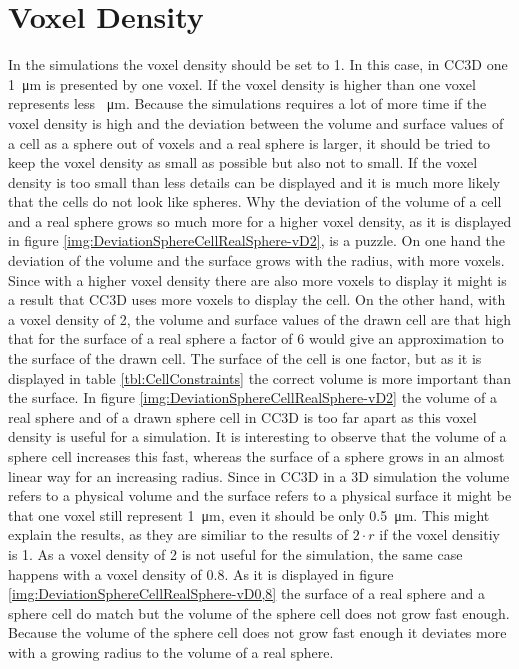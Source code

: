 \section{Voxel Density}\label{sec:vD}
In the simulations the voxel density should be set to 1. In this case, in \ac{CC3D} one \SI{1}{\micro\metre} is presented by one voxel. If the voxel density is higher than one voxel represents less \SI{}{\micro\metre}. Because the simulations requires a lot of more time if the voxel density is high and the deviation between the volume and surface values of a cell as a sphere out of voxels and a real sphere is larger, it should be tried to keep the voxel density as small as possible but also not to small. If the voxel density is too small than less details can be displayed and it is much more likely that the cells do not look like spheres. Why the deviation of the volume of a cell and a real sphere grows so much more for a higher voxel density, as it is displayed in figure \ref{img:DeviationSphereCellRealSphere-vD2}, is a puzzle. \newline
On one hand the deviation of the volume and the surface grows with the radius, with more voxels. Since with a higher voxel density there are also more voxels to display it might is a result that \ac{CC3D} uses more voxels to display the cell. On the other hand, with a voxel density of 2, the volume and surface values of the drawn cell are that high that for the surface of a real sphere a factor of 6 would give an approximation to the surface of the drawn cell. \newline
The surface of the cell is one factor, but as it is displayed in table \ref{tbl:CellConstraints} the correct volume is more important than the surface. In figure \ref{img:DeviationSphereCellRealSphere-vD2} the volume of a real sphere and of a drawn sphere cell in \ac{CC3D} is too far apart as this voxel density is useful for a simulation. It is interesting to observe that the volume of a sphere cell increases this fast, whereas the surface of a sphere grows in an almost linear way for an increasing radius. Since in \ac{CC3D} in a 3D simulation the volume refers to a physical volume and the surface refers to a physical surface it might be that one voxel still represent \SI{1}{\micro\metre}, even it should be only \SI{0.5}{\micro\metre}. This might explain the results, as they are similiar to the results of $2 \cdot r$ if the voxel densitiy is 1. \newline
As a voxel density of 2 is not useful for the simulation, the same case happens with a voxel density of 0.8. As it is displayed in figure \ref{img:DeviationSphereCellRealSphere-vD0,8} the surface of a real sphere and a sphere cell do match but the volume of the sphere cell does not grow fast enough. Because the volume of the sphere cell does not grow fast enough it deviates more with a growing radius to the volume of a real sphere. \newline
